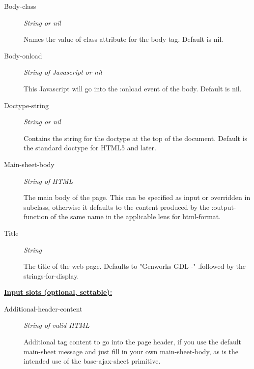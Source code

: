 \documentclass [11pt]{book}
\begin{document}
\begin{itemize}
\begin{description}

\item [Body-class]
\emph{String or nil}

 Names the value of class attribute for the body tag. Default is nil.




\item [Body-onload]
\emph{String of Javascript or nil}

 This Javascript will go into the :onload event of the body.
Default is nil.




\item [Doctype-string]
\emph{String or nil}

 Contains the string for the doctype at the top of the document.
Default is the standard doctype for HTML5 and later.




\item [Main-sheet-body]
\emph{String of HTML}

 The main body of the page.
This can be specified as input or overridden in subclass, otherwise it defaults
to the content produced by the :output-function of the same name
in the applicable lens for  html-format.




\item [Title]
\emph{String}

 The title of the web page. Defaults to "Genworks GDL -"
.followed by the strings-for-display.




\end{description}






\textbf{
\underline{Input slots (optional, settable):}}

\begin{description}

\item [Additional-header-content]
\emph{String of valid HTML}

 Additional tag content to go into the page header,
if you use the default main-sheet message and just fill in your own main-sheet-body, as
is the intended use of the base-ajax-sheet primitive.





\end{description}
\end{itemize}
\end{document}
